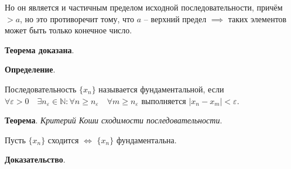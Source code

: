 \documentclass[a4paper,oneside]{article}
\newcommand{\parspace}{\vspace{10pt}}
\begin{document}
Но он является и частичным пределом исходной последовательности, причём $> a$, но
это противоречит тому, что $a$ -- верхний предел $\implies$ таких элементов может
быть только конечное число.

\textbf{Теорема доказана}.

\parspace

\textbf{Определение}.

Последовательность $\{x_n\}$ называется фундаментальной, если 
$\forall \varepsilon > 0 \quad \exists n_\varepsilon \in \mathbb{N}:
\forall n \ge n_\varepsilon \quad \forall m \ge n_\varepsilon$
выполняется $|x_n - x_m| < \varepsilon$.

\parspace

\textbf{Теорема}. \textit{Критерий Коши сходимости последовательности}.

Пусть $\{x_n\}$ сходится $\Leftrightarrow$ $\{x_n\}$ фундаментальна.

\textbf{Доказательство}.
\end{document}
